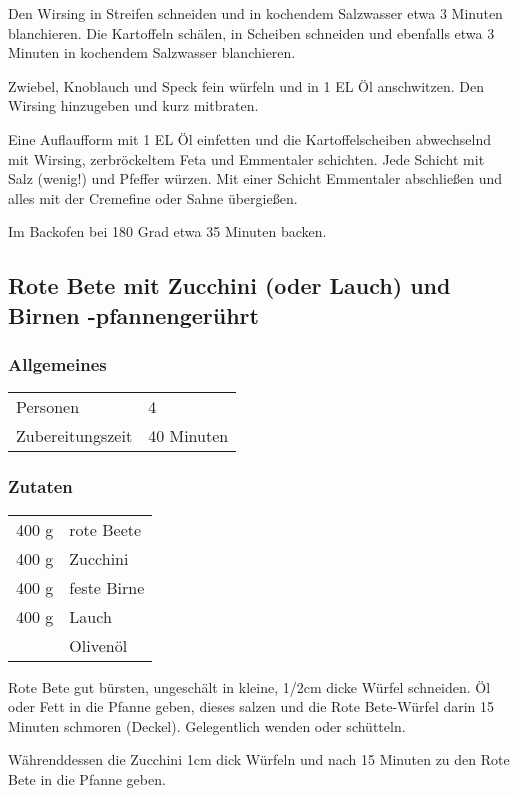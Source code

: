 Den Wirsing in Streifen schneiden und in kochendem Salzwasser etwa 3 Minuten blanchieren. Die Kartoffeln schälen, in Scheiben schneiden und ebenfalls etwa 3 Minuten in kochendem Salzwasser blanchieren.

Zwiebel, Knoblauch und Speck fein würfeln und in 1 EL Öl anschwitzen. Den Wirsing hinzugeben und kurz mitbraten.

Eine Auflaufform mit 1 EL Öl einfetten und die Kartoffelscheiben abwechselnd mit Wirsing, zerbröckeltem Feta und Emmentaler schichten. Jede Schicht mit Salz (wenig!) und Pfeffer würzen. Mit einer Schicht Emmentaler abschließen und alles mit der Cremefine oder Sahne übergießen.

Im Backofen bei 180 Grad etwa 35 Minuten backen.



\subsection{Rote Bete mit Zucchini (oder Lauch) und Birnen -pfannengerührt} \label{sec:RoteBete:pfannengerührt}
\subsubsection*{Allgemeines}
\begin{tabular}{ll}
    Personen         &  4   \\
    Zubereitungszeit &  40 Minuten \\
\end{tabular} 
\subsubsection*{Zutaten}
\begin{tabular}{r l}
    400 g & rote Beete  \\
    400 g & Zucchini    \\
    400 g & feste Birne \\
    400 g & Lauch       \\
    & Olivenöl
\end{tabular}


Rote Bete gut bürsten, ungeschält in kleine, 1/2cm dicke Würfel schneiden. Öl oder Fett in die Pfanne geben, dieses salzen und die Rote Bete-Würfel darin 15 Minuten schmoren (Deckel). Gelegentlich wenden oder schütteln.

Währenddessen die Zucchini 1cm dick Würfeln und nach 15 Minuten zu den Rote Bete in die Pfanne geben.



